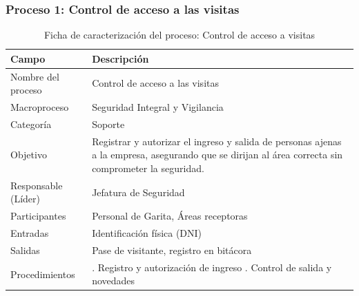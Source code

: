 \documentclass[11pt, a4paper, oneside]{report}
\begin{document}
\subsubsection{Proceso 1: Control de acceso a las visitas}

\begin{table}[H]
\centering\small
\renewcommand{\arraystretch}{1.35}
\setlength{\tabcolsep}{6pt}
\begin{tabularx}{\textwidth}{|>{\raggedright\arraybackslash}p{}|>{\raggedright\arraybackslash}X|}
\hline
\rowcolor{upeu_dark}
\color{white}\bfseries Campo & \color{white}\bfseries Descripción \\ \hline
\rowcolor{gray!10}
Nombre del proceso & Control de acceso a las visitas \\ \hline
Macroproceso & Seguridad Integral y Vigilancia \\ \hline
\rowcolor{gray!10}
Categoría & Soporte \\ \hline
Objetivo & Registrar y autorizar el ingreso y salida de personas ajenas a la empresa, asegurando que se dirijan al área correcta sin comprometer la seguridad. \\ \hline
\rowcolor{gray!10}
Responsable (Líder) & Jefatura de Seguridad \\ \hline
Participantes & Personal de Garita, Áreas receptoras \\ \hline
\rowcolor{gray!10}
Entradas & Identificación física (DNI) \\ \hline
Salidas & Pase de visitante, registro en bitácora \\ \hline
\rowcolor{gray!10}
Procedimientos & 1. Registro y autorización de ingreso \newline 2. Control de salida y novedades \\ \hline
\end{tabularx}
\caption{Ficha de caracterización del proceso: Control de acceso a visitas}
\end{table}
\end{document}
